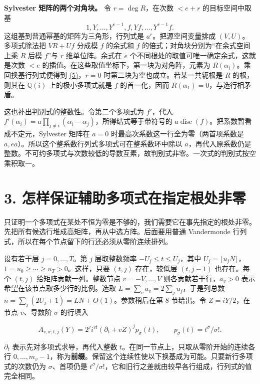 \documentclass[11pt,a4paper]{article}
\begin{document}
\textbf{Sylvester 矩阵的两个对角块。} 令 \(r=\deg R\)，在次数 \(<e+r\) 的目标空间中取基 \[
 1,Y,\ldots,Y^{e-1},f,Yf,\ldots,Y^{r-1}f.
\] 这组基到普通幂基的矩阵为三角形，行列式是 \(a^r\)。把源空间变量排成 \((V,U)\)。多项式除法把 \(VR+Uf\) 分成模 \(f\) 的余式和 \(f\) 的倍式；对角块分别为``在余式空间上乘 \(R\) 后模 \(f\)''与 \(r\) 维单位阵。余式在 \(e\) 个不同根处的取值可唯一确定余式，这就是次数 \(<e\) 的插值。在这些取值坐标下，第一块为对角阵，元素为 \(R(\alpha_i)\)。乘回换基行列式便得到 \hyperref[eq:5]{(5)}，\(r=0\) 时第二块为空也成立。若某一共轭根是 \(R\) 的根，则其在 \(\mathbb Q(i)\) 上的极小多项式就是 \(f\) 的首一化，因而 \(R(\alpha_1)=0\)，与选行相矛盾。

这也补出判别式的整数性。令第二个多项式为 \(f'\)，代入 \(f'(\alpha_i)=a\prod_{j\ne i}(\alpha_i-\alpha_j)\)，所得结式等于带符号的 \(a\operatorname{disc}(f)\)。把系数暂看成不定元，Sylvester 矩阵在 \(a=0\) 时最高次系数这一行全为零（两首项系数是 \(a,ea\)）。所以这个整系数行列式多项式可在整系数环中除以 \(a\)，再代入原系数仍是整数。不可约多项式与次数较低的导数互素，故判别式非零。一次式的判别式按空乘积取一。

\section{3. 怎样保证辅助多项式在指定根处非零}\label{ux600eux6837ux4fddux8bc1ux8f85ux52a9ux591aux9879ux5f0fux5728ux6307ux5b9aux6839ux5904ux975eux96f6}

只证明一个多项式在某处不恒为零是不够的，我们需要它在事先指定的根处非零。先把所有候选行堆成高矩阵，再从中选方阵。后面要用普通 Vandermonde 行列式，所以在每个节点留下的行还必须从零阶连续排列。

设有若干层 \(j=0,\ldots,T\)。第 \(j\) 层取整数频率 \(-U_j\le t\le U_j\)，其中 \(U_j=\lfloor u_j N\rfloor\)，\(1=u_0\ge\cdots\ge u_T>0\)。这样，只要 \((t,j)\) 存在，较低层 \((t,j-1)\) 也存在。每个 \((t,j)\) 给矩阵贡献一列。整数节点 \(v=-V,\ldots,V\) 则各贡献若干行，\(a_v>0\) 表示希望在该节点取多少行的比例。选取 \(L=\sum_v a_v=2\sum_j u_j\)，于是列总数 \(n=\sum_j(2U_j+1)=LN+O(1)\)。参数稍后在第 8 节给出。令 \(Z=iY/2\)，在节点 \(v\)、导数阶 \(\sigma\) 的行填入

\[
 A_{v,\sigma;t,j}(Y)=2^j i^{vt}(\partial_t+vZ)^j p_\sigma(t),\qquad
 p_\sigma(t)=t^\sigma/\sigma! .                                           \tag{6}\label{eq:6}
\]

\(\partial_t\) 表示先对多项式求导，再代入整数 \(t\)。在同一节点上，只取从零阶开始的连续各行 \(0,\ldots,m_v-1\)，称为\textbf{前缀}。保留这个连续性使以下换基成为可能。只要新行多项式的次数仍为 \(\sigma\)、首项仍是 \(t^\sigma/\sigma!\)，它和旧行之差就由较早各行组成，行列式的值完全相同。
\end{document}
